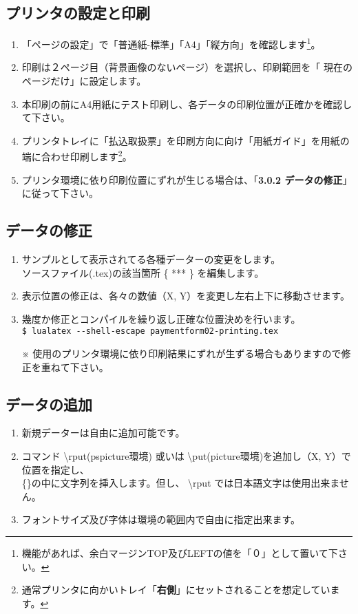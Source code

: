 \documentclass[a4paper,10pt,titlepage]{ltjsarticle}
\def\colH#1{\color[HTML]{#1}}
\def\bs#1{\textbackslash{#1}}
\begin{document}
\subsection{プリンタの設定と印刷}
\begin{enumerate}
  \item 「ページの設定」で「普通紙-標準」「A4」「縦方向」を確認します\footnote{機能があれば、余白マージンTOP及びLEFTの値を「０」として置いて下さい。}。
  \item 印刷は２ページ目（背景画像のないページ）を選択し、印刷範囲を「{\colH{800000} 現在のページだけ}」に設定します。
  \item 本印刷の前にA4用紙にテスト印刷し、各データの印刷位置が正確かを確認して下さい。
  \item プリンタトレイに「払込取扱票」を印刷方向に向け「用紙ガイド」を用紙の端に合わせ印刷します\footnote{通常プリンタに向かいトレイ「{\bfseries 右側}」にセットされることを想定しています。}。
  \item プリンタ環境に依り印刷位置にずれが生じる場合は、「{\bfseries 3.0.2 データの修正}」に従って下さい。

\end{enumerate}

\subsection{データの修正}
 \begin{enumerate}
   \item サンプルとして表示されてる各種データーの変更をします。\\
   ソースファイル(.tex)の該当箇所 \{\; *** \;\} を編集します。

   \item 表示位置の修正は、各々の数値（\;X, Y\;）を変更し左右上下に移動させます。

   \item 幾度か修正とコンパイルを繰り返し正確な位置決めを行います。\\
   \verb|$ lualatex --shell-escape paymentform02-printing.tex|           
  \item[※] 使用のプリンタ環境に依り印刷結果にずれが生ずる場合もありますので修正を重ねて下さい。
 \end{enumerate}

\subsection{データの追加}
 \begin{enumerate}
   \item 新規データーは自由に追加可能です。
   \item コマンド {\colH{800000} \bs rput}(pspicture環境) 或いは {\colH{800000} \bs put}(picture環境)を追加し（\;X, Y\;）で位置を指定し、\\
   \{\quad \}の中に文字列を挿入します。但し、 {\colH{800000} \bs rput では日本語文字は使用出来ません}。
   \item フォントサイズ及び字体は環境の範囲内で自由に指定出来ます。
   　
 \end{enumerate}
\end{document}
